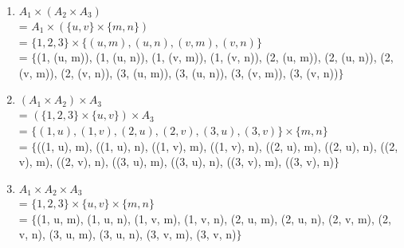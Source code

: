 \documentclass[12pt]{article}
\begin{document}
\begin{enumerate}[label = 34\alph*.]
    \item 
        $A_1 \times (A_2 \times A_3)$ \\
        = $A_1 \times (\{u, v\} \times \{m, n\})$ \\
        = $\{1, 2, 3\} \times \{(u, m), (u, n), (v, m), (v, n)\}$ \\
        = $\{$(1, (u, m)), (1, (u, n)), (1, (v, m)), (1, (v, n)),
          (2, (u, m)), (2, (u, n)), (2, (v, m)), (2, (v, n)),
          (3, (u, m)), (3, (u, n)), (3, (v, m)), (3, (v, n))$\}$
    \item 
        $(A_1 \times A_2) \times A_3$ \\
        = $(\{1, 2, 3\} \times \{u, v\}) \times A_3$ \\
        = $\{(1, u), (1, v), (2, u), (2, v), (3, u), (3, v)\} \times \{m, n\}$ \\
        = $\{$((1, u), m), ((1, u), n), ((1, v), m), ((1, v), n), 
          ((2, u), m), ((2, u), n), ((2, v), m), ((2, v), n), 
          ((3, u), m), ((3, u), n), ((3, v), m), ((3, v), n)$\}$
    \item 
        $A_1 \times A_2 \times A_3$ \\
        = $\{1, 2, 3\} \times \{u, v\} \times \{m, n\}$ \\
        = $\{$(1, u, m), (1, u, n), (1, v, m), (1, v, n), 
          (2, u, m), (2, u, n), (2, v, m), (2, v, n), 
          (3, u, m), (3, u, n), (3, v, m), (3, v, n)$\}$
\end{enumerate}
\end{document}
